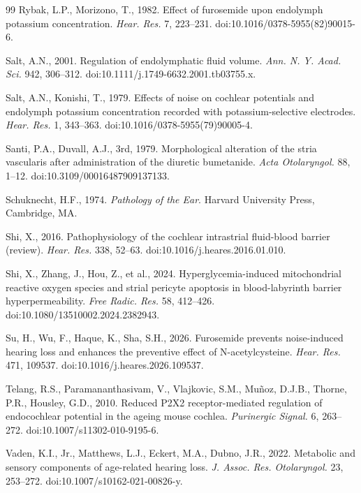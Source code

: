 \documentclass[final,5p,times]{elsarticle}
\begin{document}
\begin{thebibliography}{99}
Rybak, L.P., Morizono, T., 1982. Effect of furosemide upon endolymph potassium concentration. \emph{Hear. Res.} 7, 223--231. doi:10.1016/0378-5955(82)90015-6.

Salt, A.N., 2001. Regulation of endolymphatic fluid volume. \emph{Ann. N. Y. Acad. Sci.} 942, 306--312. doi:10.1111/j.1749-6632.2001.tb03755.x.

Salt, A.N., Konishi, T., 1979. Effects of noise on cochlear potentials and endolymph potassium concentration recorded with potassium-selective electrodes. \emph{Hear. Res.} 1, 343--363. doi:10.1016/0378-5955(79)90005-4.

Santi, P.A., Duvall, A.J., 3rd, 1979. Morphological alteration of the stria vascularis after administration of the diuretic bumetanide. \emph{Acta Otolaryngol.} 88, 1--12. doi:10.3109/00016487909137133.

Schuknecht, H.F., 1974. \emph{Pathology of the Ear}. Harvard University Press, Cambridge, MA.

Shi, X., 2016. Pathophysiology of the cochlear intrastrial fluid-blood barrier (review). \emph{Hear. Res.} 338, 52--63. doi:10.1016/j.heares.2016.01.010.

Shi, X., Zhang, J., Hou, Z., et al., 2024. Hyperglycemia-induced mitochondrial reactive oxygen species and strial pericyte apoptosis in blood-labyrinth barrier hyperpermeability. \emph{Free Radic. Res.} 58, 412--426. doi:10.1080/13510002.2024.2382943.

Su, H., Wu, F., Haque, K., Sha, S.H., 2026. Furosemide prevents noise-induced hearing loss and enhances the preventive effect of N-acetylcysteine. \emph{Hear. Res.} 471, 109537. doi:10.1016/j.heares.2026.109537.

Telang, R.S., Paramananthasivam, V., Vlajkovic, S.M., Muñoz, D.J.B., Thorne, P.R., Housley, G.D., 2010. Reduced P2X2 receptor-mediated regulation of endocochlear potential in the ageing mouse cochlea. \emph{Purinergic Signal.} 6, 263--272. doi:10.1007/s11302-010-9195-6.

Vaden, K.I., Jr., Matthews, L.J., Eckert, M.A., Dubno, J.R., 2022. Metabolic and sensory components of age-related hearing loss. \emph{J. Assoc. Res. Otolaryngol.} 23, 253--272. doi:10.1007/s10162-021-00826-y.


\end{thebibliography}
\end{document}
